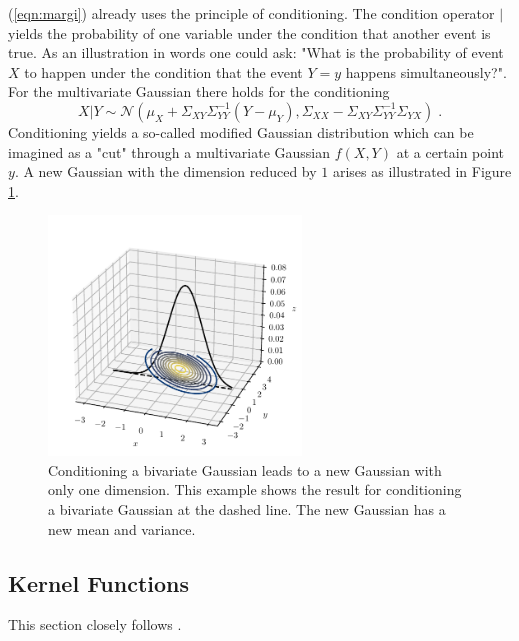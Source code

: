 \documentclass[%
  a4paper,oneside,%
  11pt,%
  smallchapters,
  style=printdev,
  extramargin,
  green,%
  rgb, <cmyk>
  ]{tubsbook}
\begin{document}
(\ref{eqn:margi}) already uses the principle of conditioning. The condition operator $|$ yields the probability of one variable under the condition that another event is true. As an illustration in words one could ask: "What is the probability of event $X$ to happen under the condition that the event $Y=y$ happens simultaneously?".
For the multivariate Gaussian there holds for the conditioning
\begin{equation}
X|Y \sim \mathcal{N}(\mu_X +\Sigma_{XY} \Sigma_{YY}^{-1}(Y-\mu_Y), \Sigma_{XX} - \Sigma_{XY}\Sigma_{YY}^{-1}\Sigma_{YX} ) \;.
\label{eqn:condMat}
\end{equation}
%
Conditioning yields a so-called modified Gaussian distribution which can be imagined as a "cut" through a multivariate Gaussian $f(X,Y)$ at a certain point $y$. A new Gaussian with the dimension reduced by $1$ arises as illustrated in Figure \ref{fig:GaussCut3d}.

%
%
\begin{figure}[!ht]
\begin{center}
\includegraphics[width=0.6\textwidth]{pics/Gaussians3dCut}
\caption[Conditioning of a Gaussian]{Conditioning a bivariate Gaussian leads to a new Gaussian with only one dimension. This example shows the result for conditioning a bivariate Gaussian at the dashed line. The new Gaussian has a new mean and variance.}
\label{fig:GaussCut3d}
\end{center}
\end{figure}



\subsection{Kernel Functions}
\label{sec:Kernels}
This section closely follows \cite[p. 79 ff.]{rasmussen2006}.
 
\end{document}
